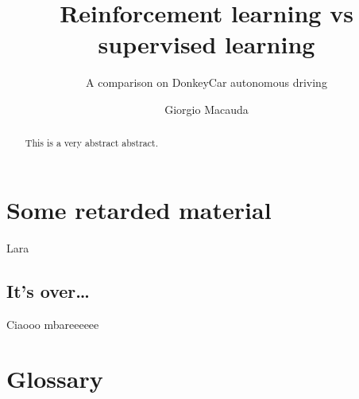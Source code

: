 \documentclass[mscthesis]{usiinfthesis}
\title{Reinforcement learning vs supervised learning} %
\subtitle{A comparison on DonkeyCar autonomous driving} %
\author{Giorgio Macauda} %
\begin{document}
\maketitle %

\frontmatter %

\begin{abstract}
This is a very abstract abstract. 
\lipsum
\end{abstract}
\begin{acknowledgements}
\lipsum 
\end{acknowledgements}

\tableofcontents 
\listoffigures %
\listoftables %

\mainmatter









\appendix %

\chapter{Some retarded material}
Lara
\section{It's over\dots}
Ciaooo mbareeeeee

\backmatter

\chapter{Glossary} %

%
%



\end{document}
